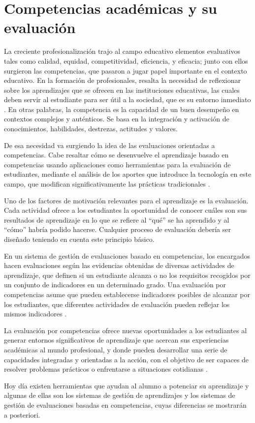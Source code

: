 \section{Competencias académicas y su evaluación}
La creciente profesionalización trajo al campo educativo elementos evaluativos tales como calidad, equidad, competitividad, eficiencia, y eficacia; junto con ellos surgieron las competencias, que pasaron a jugar papel importante en el contexto educativo. En la formación de profesionales, resalta la necesidad de reflexionar sobre los aprendizajes que se ofrecen en las instituciones educativas, las cuales deben servir al estudiante para ser útil a la sociedad, que es su entorno inmediato \citep{kuh_using_2015}. En otras palabras, la competencia es la capacidad de un buen desempeño en contextos complejos y auténticos. Se basa en la integración y activación de conocimientos, habilidades, destrezas, actitudes y valores.

De esa necesidad va surgiendo la idea de las evaluaciones orientadas a competencias. Cabe resaltar cómo se desenvuelve el aprendizaje basado en competencias usando aplicaciones como herramientas para la evaluación de estudiantes, mediante el análisis de los aportes que introduce la tecnología en este campo, que modifican significativamente las prácticas tradicionales \citep{carriveau_connecting_2016}.

Uno de los factores de motivación relevantes para el aprendizaje es la evaluación. Cada actividad ofrece a los estudiantes la oportunidad de conocer cuáles son sus resultados de aprendizaje en lo que se refiere al \enquote{qué} se ha aprendido y al \enquote{cómo} habría podido hacerse. Cualquier proceso de evaluación debería ser diseñado teniendo en cuenta este principio básico.

En un sistema de gestión de evaluaciones basado en competencias, los encargados hacen evaluaciones según las evidencias obtenidas de diversas actividades de aprendizaje, que definen si un estudiante alcanza o no los requisitos recogidos por un conjunto de indicadores en un determinado grado. Una evaluación por competencias asume que pueden establecerse indicadores posibles de alcanzar por los estudiantes, que diferentes actividades de evaluación pueden reflejar los mismos indicadores \citep{barrio_minton_evaluating_2016}.

La evaluación por competencias ofrece nuevas oportunidades a los estudiantes al generar entornos significativos de aprendizaje que acercan sus experiencias académicas al mundo profesional, y donde pueden desarrollar una serie de capacidades integradas y orientadas a la acción, con el objetivo de ser capaces de resolver problemas prácticos o enfrentarse a situaciones cotidianas \citep{carriveau_connecting_2016}.

Hoy día existen herramientas que ayudan al alumno a potenciar su aprendizaje y algunas de ellas son los sistemas de gestión de aprendizajes y los sistemas de gestión de evaluaciones basadas en competencias, cuyas diferencias se mostrarán a posteriori.